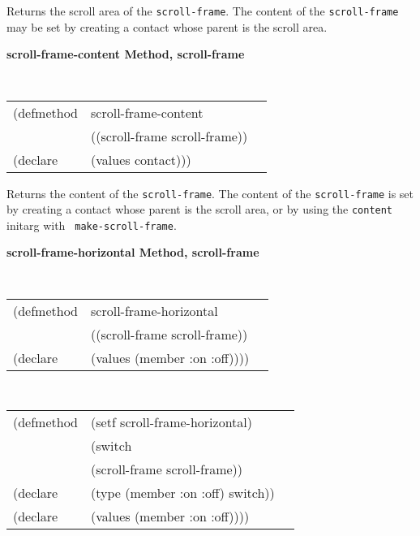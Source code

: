 \begin{flushright} \parbox[t]{6.125in}{
Returns the  scroll area of the {\tt scroll-frame}. The content of the
{\tt scroll-frame}  may be set by creating a contact whose parent is the
scroll area.   }\end{flushright}

{\samepage
{\large {\bf scroll-frame-content \hfill Method, scroll-frame}}
\begin{flushright} \parbox[t]{6.125in}{
\tt
\begin{tabular}{lll}
\raggedright
(defmethod & scroll-frame-content & \\
& ((scroll-frame  scroll-frame)) \\
(declare & (values contact)))
\end{tabular}
\rm

}\end{flushright}}

\begin{flushright} \parbox[t]{6.125in}{
Returns the  content of the {\tt scroll-frame}. The content of the
{\tt scroll-frame}  is set by creating a contact whose parent is the scroll
area, or by using the {\tt content} initarg with {\tt
make-scroll-frame}. 
}\end{flushright}


{\samepage
{\large {\bf scroll-frame-horizontal \hfill Method, scroll-frame}}
\begin{flushright} \parbox[t]{6.125in}{
\tt
\begin{tabular}{lll}
\raggedright
(defmethod & scroll-frame-horizontal & \\
& ((scroll-frame  scroll-frame)) \\
(declare & (values (member :on :off))))
\end{tabular}
\rm

}\end{flushright}}

{\samepage
\begin{flushright} \parbox[t]{6.125in}{
\tt
\begin{tabular}{lll}
\raggedright
(defmethod & (setf scroll-frame-horizontal) & \\
         & (switch \\
         & (scroll-frame scroll-frame)) \\
(declare &(type (member :on :off)  switch))\\
(declare & (values (member :on :off))))
\end{tabular}
\rm
}
\end{flushright}}



